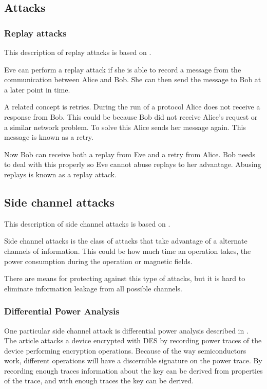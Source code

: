 \subsection{Attacks}\label{attacks} 


\subsubsection{Replay attacks}\label{replay_attack}
This description of replay attacks is based on \citet[p.~223]{cryptoenginering}.

Eve can perform a replay attack if she is able to record a message from the communication between Alice and Bob.
She can then send the message to Bob at a later point in time. 

A related concept is retries.
During the run of a protocol Alice does not receive a response from Bob.
This could be because Bob did not receive Alice's request or a similar network problem.
To solve this Alice sends her message again.
This message is known as a retry.

Now Bob can receive both a replay from Eve and a retry from Alice.
Bob needs to deal with this properly so Eve cannot abuse replays to her advantage.
Abusing replays is known as a replay attack.


\subsection{Side channel attacks}
This description of side channel attacks is based on \citet[p.~132]{cryptoenginering}.

Side channel attacks is the class of attacks that take advantage of a alternate channels of information.
This could be how much time an operation takes, the power consumption during the operation or magnetic fields.

There are means for protecting against this type of attacks, but it is hard to eliminate information leakage from all possible channels.

\subsubsection{Differential Power Analysis}
One particular side channel attack is differential power analysis described in \citet{DPA}.
The article attacks a device encrypted with DES by recording power traces of the device performing encryption operations.
Because of the way semiconductors work, different operations will have a discernible signature on the power trace.
By recording enough traces information about the key can be derived from properties of the trace, and with enough traces the key can be derived.

